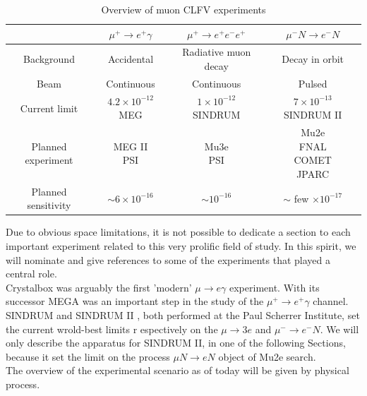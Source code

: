 \documentclass[12pt,a4paper,openright, oneside, titlepage]{book} %
\begin{document}
\begin{table}[!h]
\centering
\begin{tabular}{|c||c|c|c|}
\hline
& $\mu^+\rightarrow e^+\gamma$ & $\mu^+\rightarrow e^+e^-e^+$ & $\mu^- N \rightarrow e^- N$ \\
\hline \hline 
Background &
Accidental &
Radiative muon decay &
Decay in orbit \\
\hline
Beam &
Continuous &
Continuous &
Pulsed \\
\hline
Current limit &
\makecell{$4.2 \times 10^{-12}$ \\ MEG \cite{MEG}} &
\makecell{$1\times10^{-12}$ \\ SINDRUM \cite{SINDRUM}} & 
\makecell{$7\times10^{-13}$ \\ SINDRUM II \cite{SINDRUMII}} \\
\hline
Planned experiment &
\makecell{MEG II \\ PSI \cite{MEG_upgrade}\cite{MEG_II}\cite{Papa}}&
\makecell{Mu3e \\ PSI \cite{Mu3e:2014}\cite{Mu3e:2016}\cite{Papa}} &
\makecell{Mu2e \\ FNAL \cite{mu2e_proposal} \cite{MTDR}\\ COMET \\ JPARC\cite{COMET_2009}\cite{COMET_2012}\cite{COMET_2012_2}\cite{COMET_I}} \\
\hline
Planned sensitivity &
$\sim 6\times 10^{-16}$&
$\sim 10^{-16}$&
$\sim$ few $\times 10^{-17}$ \\
\hline
\end{tabular}
\caption[CLFV searches with muons]{Overview of muon CLFV experiments}
\label{T_CLFV_mu}
\end{table}

\noindent Due to obvious space limitations, it is not possible
to dedicate a section to each important experiment related to this very prolific field of study. 
In this spirit, we will nominate and give references to some of the experiments that played a central role. \\
Crystalbox \cite{Crystalbox:1984} \cite{Crystalbox:1988} was arguably the first 'modern' $\mu\rightarrow e\gamma$ experiment. With its successor MEGA \cite{MEGA:1999} \cite{MEGA:2002} was an important step in the study of the $\mu^+\rightarrow e^+\gamma$ channel. SINDRUM \cite{SINDRUM} and SINDRUM II \cite{SINDRUMII}, 
both performed at the Paul Scherrer Institute, set the current wrold-best limits r
espectively on the $\mu \rightarrow 3 e$ and $\mu^-\rightarrow e^- N$. 
We will only describe the apparatus for SINDRUM II, in one of the following Sections, 
because it set the limit on the process $\mu N \rightarrow e N$ object of Mu2e search.\\
The overview of the experimental scenario as of today will be given by physical process.
\end{document}
